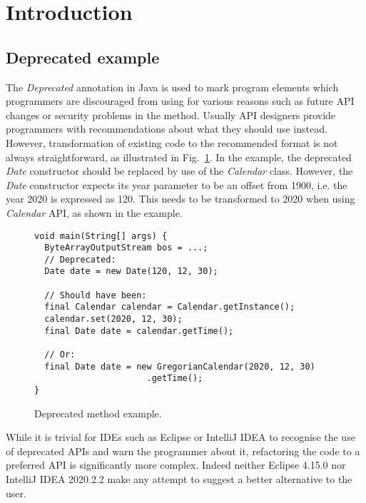 \documentclass[runningheads,a4paper]{llncs}
\begin{document}






\section{Introduction}

\subsection{Deprecated example}

The {\em Deprecated} annotation in Java is used to mark program elements which
programmers are discouraged from using for various reasons such as future API
changes or security problems in the method. Usually API designers provide
programmers with recommendations about what they should use instead. However,
transformation of existing code to the recommended format is not always
straightforward, as illustrated in Fig.~\ref{ex:deprecated-method}. In the
example, the deprecated {\em Date} constructor should be replaced by use of the
{\em Calendar} class. However, the {\em Date} constructor expects its year
parameter to be an offset from 1900, i.e. the year 2020 is expressed as 120.
This needs to be transformed to 2020 when using {\em Calendar} API, as shown in
the example.

\begin{figure}
\begin{lstlisting}[mathescape=true,showstringspaces=false]
void main(String[] args) {
  ByteArrayOutputStream bos = ...;
  // Deprecated:
  Date date = new Date(120, 12, 30);

  // Should have been:
  final Calendar calendar = Calendar.getInstance();
  calendar.set(2020, 12, 30);
  final Date date = calendar.getTime();

  // Or:
  final Date date = new GregorianCalendar(2020, 12, 30)
                      .getTime();
}
\end{lstlisting}
\caption{Deprecated method example.}
\label{ex:deprecated-method}
\end{figure}

While it is trivial for IDEs such as Eclipse or IntelliJ IDEA to recognise the
use of deprecated APIs and warn the programmer about it, refactoring the code to
a preferred API is significantly more complex. Indeed neither Eclipse 4.15.0 nor
IntelliJ IDEA 2020.2.2 make any attempt to suggest a better alternative to the
user.
\end{document}
